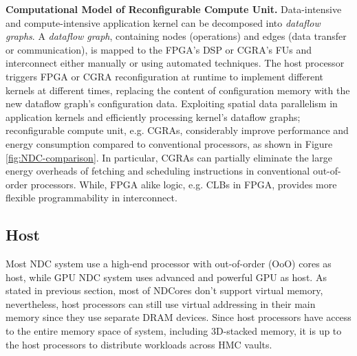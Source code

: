 \documentclass[letterpaper, 11pt, conference, margin=1in]{ieeeconf}   %
\begin{document}
\textbf{Computational Model of Reconfigurable Compute Unit.} Data-intensive and compute-intensive application kernel can be decomposed into \textit{dataflow graphs}. A \textit{dataflow graph}, containing nodes (operations) and edges (data transfer or communication), is mapped to the FPGA's DSP or CGRA's FUs and interconnect either manually or using automated techniques. The host processor triggers FPGA or CGRA reconfiguration at runtime to implement different kernels at different times, replacing the content of configuration memory with the new dataflow graph's configuration data. Exploiting spatial data parallelism in application kernels and efficiently processing kernel's dataflow graphs; reconfigurable compute unit, e.g. CGRAs, considerably improve performance and energy consumption compared to conventional processors, as shown in Figure \ref{fig:NDC-comparison}. In particular, CGRAs can partially eliminate the large energy overheads of fetching and scheduling instructions in conventional out-of-order processors. While, FPGA alike logic, e.g. CLBs in FPGA, provides more flexible programmability in interconnect.

\subsection{Host}
Most NDC system use a high-end processor with out-of-order (OoO) cores as host, while GPU NDC system uses advanced and powerful GPU as host. As stated in previous section, most of NDCores don't support virtual memory, nevertheless, host processors can still use virtual addressing in their main memory since they use separate DRAM devices. Since host processors have access to the entire memory space of system, including 3D-stacked memory, it is up to the host processors to distribute workloads across HMC vaults.
\end{document}
